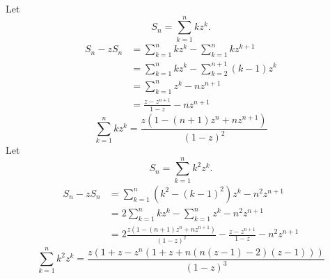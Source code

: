 {%
\begin{Solution}
  \label{solution sum k z^k}
  Let
  \[
  S_n = \sum_{k=1}^n k z^k.
  \]
  \begin{align*}
    S_n - z S_n
    &= \sum_{k=1}^n k z^k - \sum_{k=1}^n k z^{k+1} 
    \\
    &= \sum_{k=1}^n k z^k - \sum_{k=2}^{n+1} (k - 1) z^k 
    \\
    &= \sum_{k=1}^n z^k - n z^{n+1} 
    \\
    &= \frac{z - z^{n+1}}{1 - z} - n z^{n+1} 
  \end{align*}
  \[
  \boxed{
    \sum_{k=1}^n k z^k = \frac{ z ( 1 - (n + 1) z^n + n z^{n+1} ) }{ (1 - z)^2 }
    }
  \]
  Let
  \[
  S_n = \sum_{k=1}^n k^2 z^k.
  \]
  \begin{align*}
    S_n - z S_n
    &= \sum_{k=1}^n (k^2 - (k - 1)^2) z^k - n^2 z^{n+1} 
    \\
    &= 2 \sum_{k=1}^n k z^k - \sum_{k=1}^n z^k - n^2 z^{n+1} 
    \\
    &= 2 \frac{ z ( 1 - (n + 1) z^n + n z^{n+1} ) }{ (1 - z)^2 }
    - \frac{z - z^{n+1}}{1 - z} - n^2 z^{n+1} 
  \end{align*}
  \[
  \boxed{
    \sum_{k=1}^n k^2 z^k = \frac{ z ( 1 + z - z^n ( 1 + z 
      + n ( n (z - 1) - 2 ) (z - 1) ) ) }{ (1 - z)^3 }
    }
  \]
\end{Solution}


}
